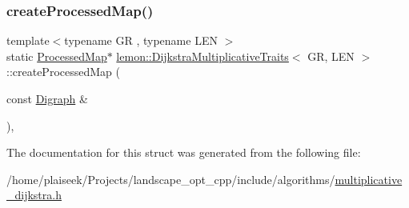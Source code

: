 \subsubsection{\texorpdfstring{create\+Processed\+Map()}{createProcessedMap()}}
{\footnotesize\ttfamily template$<$typename GR , typename L\+EN $>$ \\
static \hyperlink{structlemon_1_1_dijkstra_multiplicative_traits_a48325a83c92b35041eac397cf1728375}{Processed\+Map}$\ast$ \hyperlink{structlemon_1_1_dijkstra_multiplicative_traits}{lemon\+::\+Dijkstra\+Multiplicative\+Traits}$<$ GR, L\+EN $>$\+::create\+Processed\+Map (\begin{DoxyParamCaption}\item[{const \hyperlink{structlemon_1_1_dijkstra_multiplicative_traits_a3ad6d100e3d5d097aaaac8e5733ce3a3}{Digraph} \&}]{ }\end{DoxyParamCaption})\hspace{0.3cm}{\ttfamily [inline]}, {\ttfamily [static]}}



The documentation for this struct was generated from the following file\+:\begin{DoxyCompactItemize}
\item 
/home/plaiseek/\+Projects/landscape\+\_\+opt\+\_\+cpp/include/algorithms/\hyperlink{multiplicative__dijkstra_8h}{multiplicative\+\_\+dijkstra.\+h}\end{DoxyCompactItemize}
